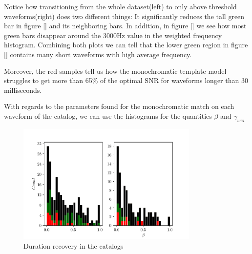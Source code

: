 Notice how transitioning from the whole dataset(left) to only above threshold waveforms(right) does two different things: It significantly reduces the tall green bar in figure \ref{}  and its neighboring bars. In addition, in figure \ref{} we see how most green bars disappear around the 3000Hz value in the weighted frequency histogram. Combining both plots we can tell that the lower green region in figure \ref{} contains many short waveforms with high average frequency.

Moreover, the red samples tell us how the monochromatic template model struggles to get more than 65\% of the optimal SNR for waveforms longer than 30 milliseconds. 


\newpage 

With regards to the parameters found for the monochromatic match on each waveform of the catalog, we can use the histograms for the quantities  $\beta$ and $\gamma_{wei}$ 

\begin{figure}[hbt!]
\begin{center}
\includegraphics[width=0.8\textwidth, angle=0]{images/Data_analysis/results/alpha_betahist.pdf}
\caption{Duration recovery in the catalogs}
\label{abhist}
\end{center}
\end{figure}


